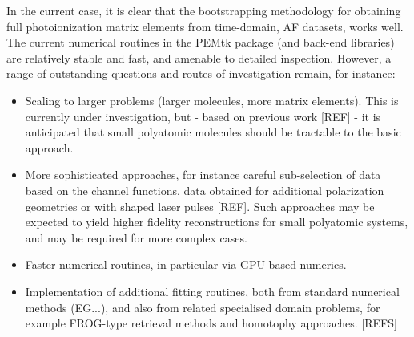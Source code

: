In the current case, it is clear that the bootstrapping methodology for obtaining full photoionization matrix elements from time-domain, AF datasets, works well. The current numerical routines in the PEMtk package (and back-end libraries) are relatively stable and fast, and amenable to detailed inspection. However, a range of outstanding questions and routes of investigation remain, for instance:

\begin{itemize}
\item Scaling to larger problems (larger molecules, more matrix elements). This is currently under investigation, but - based on previous work [REF] - it is anticipated that small polyatomic molecules should be tractable to the basic approach. 
\item More sophisticated approaches, for instance careful sub-selection of data based on the channel functions, data obtained for additional polarization geometries or with shaped laser pulses [REF]. Such approaches may be expected to yield higher fidelity reconstructions for small polyatomic systems, and may be required for more complex cases.
\item Faster numerical routines, in particular via GPU-based numerics.
\item Implementation of additional fitting routines, both from standard numerical methods (EG...), and also from related specialised domain problems, for example FROG-type retrieval methods and homotophy approaches. [REFS] 
\end{itemize}
